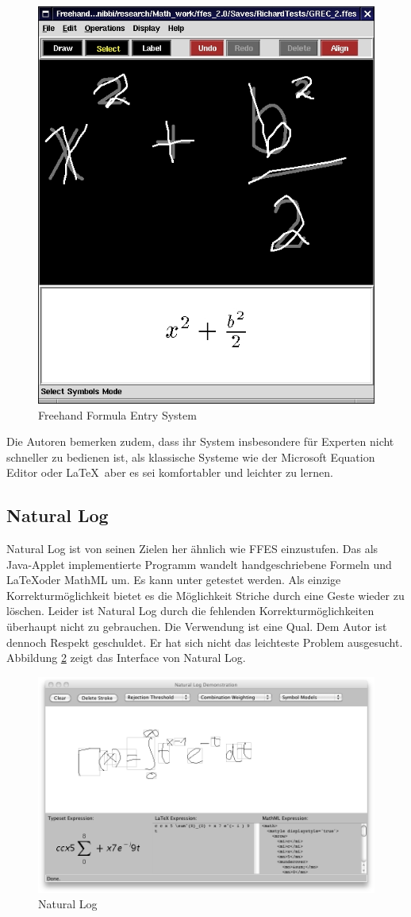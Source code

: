 \begin{figure}[htbp]
  \begin{center}
    \includegraphics[width=.5\textwidth]{figures/ffes.png}
  \end{center}
  \caption{Freehand Formula Entry System}
  \label{fig:ffes}
\end{figure}

Die Autoren bemerken zudem, dass ihr System insbesondere für Experten nicht schneller zu bedienen ist, als klassische Systeme wie der Microsoft Equation Editor oder \LaTeX~aber es sei komfortabler und leichter zu lernen.

\subsection{Natural Log}
\label{sub:natural-log}

Natural Log ist von seinen Zielen her ähnlich wie FFES einzustufen. Das als Java-Applet implementierte Programm wandelt handgeschriebene Formeln und \LaTeX oder MathML um. Es kann unter \cite{natural-log} getestet werden. Als einzige Korrekturmöglichkeit bietet es die Möglichkeit Striche durch eine Geste wieder zu löschen. Leider ist Natural Log durch die fehlenden Korrekturmöglichkeiten überhaupt nicht zu gebrauchen. Die Verwendung ist eine Qual. Dem Autor \citet{Matasakis:1999p9465} ist dennoch Respekt geschuldet. Er hat sich nicht das leichteste Problem ausgesucht. Abbildung \ref{fig:natural-log} zeigt das Interface von Natural Log.

\begin{figure}[htbp]
  \begin{center}
    \includegraphics[width=.8\textwidth]{figures/natural-log.png}
  \end{center}
  \caption{Natural Log}
  \label{fig:natural-log}
\end{figure}

